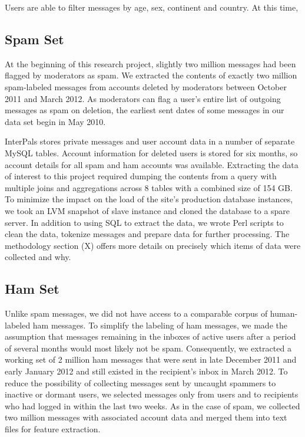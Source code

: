 \documentclass[preprint]{acm_proc_article-sp}
\begin{document}
Users are able to filter messages by age, sex, continent and country. At this time, 

\subsection{Spam Set}

At the beginning of this research project, slightly two million messages had been flagged by moderators as spam. We extracted the contents of exactly two million spam-labeled messages from accounts deleted by moderators between October 2011 and March 2012. As moderators can flag a user's entire list of outgoing messages as spam on deletion, the earliest sent dates of some messages in our data set begin in May 2010. 

InterPals stores private messages and user account data in a number of separate MySQL tables. Account information for deleted users is stored for six months, so account details for all spam and ham accounts was available. Extracting the data of interest to this project required dumping the contents from a query with multiple joins and aggregations across 8 tables with a combined size of 154 GB. To minimize the impact on the load of the site's production database instances, we took an LVM snapshot of slave instance and cloned the database to a spare server. In addition to using SQL to extract the data, we wrote Perl scripts to clean the data, tokenize messages and prepare data for further processing. The methodology section (X) offers more details on precisely which items of data were collected and why.


\subsection{Ham Set}

Unlike spam messages, we did not have access to a comparable corpus of human-labeled ham 
messages. To simplify the labeling of ham messages, we made the assumption that messages remaining in 
the inboxes of active users after a period of several months would most likely not be spam. 
Consequently, we extracted a working set of 2 million ham messages that were sent in late December 2011 and early 
January 2012 and still existed in the recipient's inbox in March 2012. To reduce the 
possibility of collecting messages sent by uncaught spammers to inactive or dormant users, 
we selected messages only from users and to recipients who had logged in within the last two 
weeks. As in the case of spam, we collected two million messages with associated account 
data and merged them into text files for feature extraction.
\end{document}
